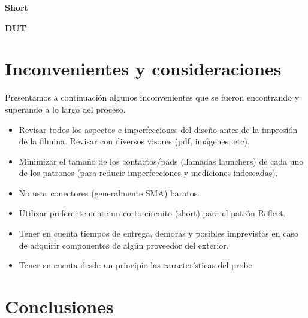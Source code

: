 \documentclass[10pt, a4paper, twocolumn]{article}
\begin{document}
\textbf{Short} \newline

\textbf{DUT} \newline


\section{Inconvenientes y consideraciones}

Presentamos a continuación algunos inconvenientes que se fueron encontrando y
superando a lo largo del proceso.

\begin{itemize}
\item Revisar todos los aspectos e imperfecciones del diseño antes de la impresión de la filmina. Revisar con diversos visores (pdf, imágenes, etc).
\item Minimizar el tamaño de los contactos/pads (llamadas launchers) de cada uno de los patrones (para reducir imperfecciones y mediciones indeseadas).
\item No usar conectores (generalmente SMA) baratos.
\item Utilizar preferentemente un corto-circuito (short) para el patrón Reflect.
\item Tener en cuenta tiempos de entrega, demoras y posibles imprevistos en caso de adquirir
componentes de algún proveedor del exterior.
\item Tener en cuenta desde un principio las características del probe.
\end{itemize}

\section{Conclusiones}


\medskip
\end{document}
